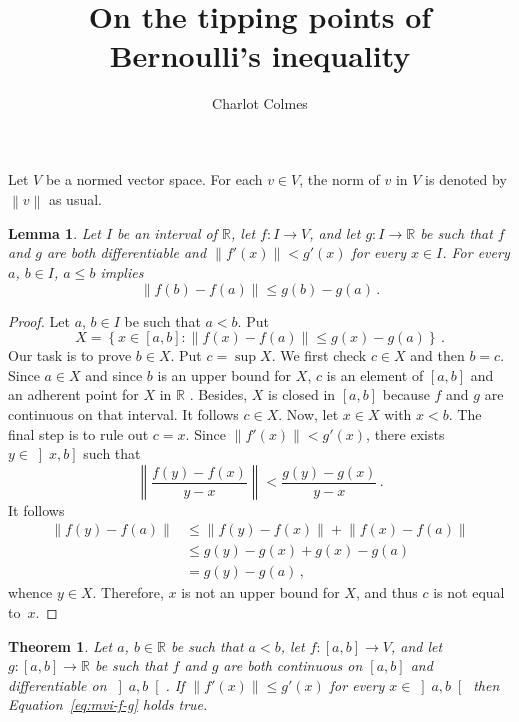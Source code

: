 \documentclass[12pt]{article}
\newcommand{\bR}{\mathbb{R}}
\newcommand{\norm}[1]{\left\| #1 \right\|}
\newtheorem{theorem}{Theorem}
\newtheorem{lemma}{Lemma}
\begin{document}
\title{On the tipping points of Bernoulli's inequality}
\author{Charlot Colmes}
\maketitle 

\sloppy

Let $V$ be a normed vector space.
For each $v \in V$, the norm of $v$ in $V$ is denoted by $\norm{v}$ as usual.

\begin{lemma} \label{lem:mvi}
  Let $I$ be an interval of $\bR$,
  let $f\colon I \to V$, and let $g\colon I \to \bR$ be such that
  $f$ and $g$ are both differentiable and $\norm{f'(x)} < g'(x)$ for every $x \in I$.
  For every $a$, $b \in I$, $a \le b$ implies
  \begin{equation} \label{eq:mvi-f-g}
    \norm{f(b) - f(a)} \le g(b) - g(a) \, .
  \end{equation} 
\end{lemma}

\begin{proof}
  Let $a$, $b \in I$ be such that $a < b$.
  Put
  $$
  X = \left\{ x \in [a, b] : \norm{f(x) - f(a)}  \le g(x) - g(a) \right\} \, .
  $$
  Our task is to prove $b \in X$.
  Put $c = \sup X$.  %
  We first check $c \in X$ and then $b = c$.
  Since $a \in X$ and since $b$ is an upper bound for $X$,
  $c$ is
  an element of $[a, b]$
  and
  an adherent point for $X$ in $\bR$ \cite{Rudin}.
  Besides, $X$ is closed in $[a, b]$ because $f$ and $g$ are continuous on that interval.
  It follows $c \in X$.
  Now, let $x \in X$ with $x < b$.
  The final step is to rule out $c = x$.
  Since $\norm{f'(x)} < g'(x)$,
  there exists $y \in \left]x, b\right]$ such that
  $$
  \norm{\frac{f(y)  - f(x)}{y - x}} < \frac{g(y) - g(x)}{y - x}  \, .
  $$
  It follows 
  \begin{align*}
    \norm{f(y) - f(a)}
    & \le \norm{f(y) - f(x)} + \norm{f(x) - f(a)} \\
    & \le g(y) - g(x) + g(x) - g(a)   \\
    & = g(y) - g(a)  \,, 
  \end{align*}
  whence $y \in X$.
  Therefore, $x$ is not an upper bound for $X$, and thus $c$ is not equal to~$x$.
\end{proof} 

\begin{theorem} \label{thm:mvi}
  Let $a$, $b \in \bR$ be such that $a < b$,
  let $f\colon [a, b] \to V$, and let $g\colon [a, b] \to \bR$ be such that
  $f$ and $g$ are both continuous on $[a, b]$ and differentiable on $\left]a, b \right[$.
  If $\norm{f'(x)} \le g'(x)$ for every $x \in \left]a, b \right[$
  then Equation~\eqref{eq:mvi-f-g} holds true.
\end{theorem}
\end{document}
